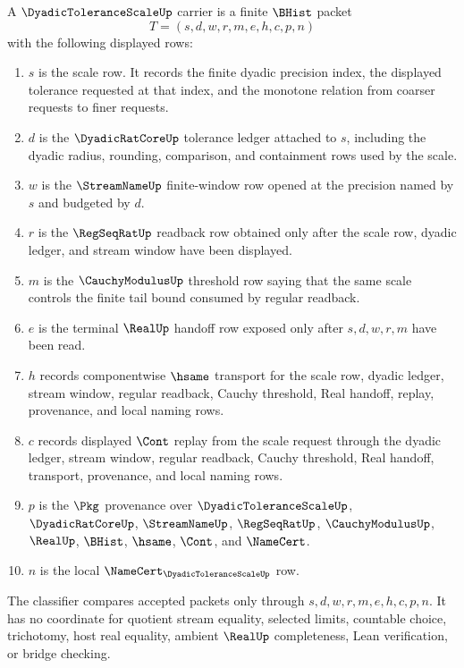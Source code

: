 \begin{definition}
\label{def:dyadic-tolerance-scale-carrier}
A $\DyadicToleranceScaleUp$ carrier is a finite $\BHist$ packet
$$
T=(s,d,w,r,m,e,h,c,p,n)
$$
with the following displayed rows:
\begin{enumerate}
\item $s$ is the scale row. It records the finite dyadic precision index, the displayed tolerance requested at that index, and the monotone relation from coarser requests to finer requests.
\item $d$ is the $\DyadicRatCoreUp$ tolerance ledger attached to $s$, including the dyadic radius, rounding, comparison, and containment rows used by the scale.
\item $w$ is the $\StreamNameUp$ finite-window row opened at the precision named by $s$ and budgeted by $d$.
\item $r$ is the $\RegSeqRatUp$ readback row obtained only after the scale row, dyadic ledger, and stream window have been displayed.
\item $m$ is the $\CauchyModulusUp$ threshold row saying that the same scale controls the finite tail bound consumed by regular readback.
\item $e$ is the terminal $\RealUp$ handoff row exposed only after $s,d,w,r,m$ have been read.
\item $h$ records componentwise $\hsame$ transport for the scale row, dyadic ledger, stream window, regular readback, Cauchy threshold, Real handoff, replay, provenance, and local naming rows.
\item $c$ records displayed $\Cont$ replay from the scale request through the dyadic ledger, stream window, regular readback, Cauchy threshold, Real handoff, transport, provenance, and local naming rows.
\item $p$ is the $\Pkg$ provenance over $\DyadicToleranceScaleUp$, $\DyadicRatCoreUp$, $\StreamNameUp$, $\RegSeqRatUp$, $\CauchyModulusUp$, $\RealUp$, $\BHist$, $\hsame$, $\Cont$, and $\NameCert$.
\item $n$ is the local $\NameCert_{\DyadicToleranceScaleUp}$ row.
\end{enumerate}
The classifier compares accepted packets only through $s,d,w,r,m,e,h,c,p,n$. It has no coordinate for quotient stream equality, selected limits, countable choice, trichotomy, host real equality, ambient $\RealUp$ completeness, Lean verification, or bridge checking.
\end{definition}

